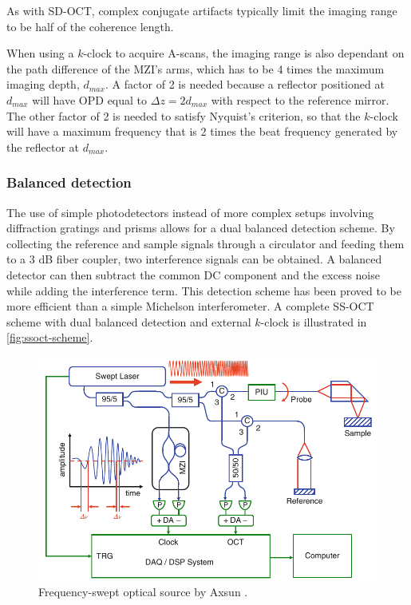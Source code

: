 As with \ac{SD-OCT}, complex conjugate artifacts typically limit the imaging range to be half of the coherence length. 

When using a $k$-clock to acquire A-scans, the imaging range is also dependant on the path difference of the \ac{MZI}'s arms, which has to be 4 times the maximum imaging depth, $d_{max}$. A factor of 2 is needed because a reflector positioned at $d_{max}$ will have \ac{OPD} equal to $\Delta z = 2d_{max}$ with respect to the reference mirror. The other factor of 2 is needed to satisfy Nyquist's criterion, so that the $k$-clock will have a maximum frequency that is 2 times the beat frequency generated by the reflector at $d_{max}$. 

\subsubsection{Balanced detection}
The use of simple photodetectors instead of more complex setups involving diffraction gratings and prisms allows for a dual balanced detection scheme. By collecting the reference and sample signals through a circulator and feeding them to a 3 dB fiber coupler, two interference signals can be obtained. A balanced detector can then subtract the common DC component and the excess noise while adding the interference term. This detection scheme has been proved to be more efficient than a simple Michelson interferometer. A complete \ac{SS-OCT} scheme with dual balanced detection and external $k$-clock is illustrated in \autoref{fig:ssoct-scheme}.

\begin{figure}[hbt]
	\myfloatalign
	\includegraphics[width=\linewidth]{gfx/ch2/ssoct-scheme}
	\caption{Frequency-swept optical source by Axsun \cite{Drexler2015}.}\label{fig:ssoct-scheme}
\end{figure}



